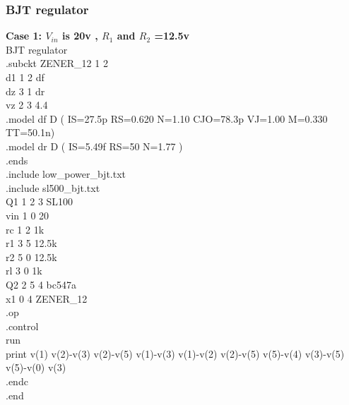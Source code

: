 \documentclass[12pt]{article}
\begin{document}
\subsubsection{BJT regulator}
\textbf{Case 1: \(V_{in}\) is 20v , \(R_{1}\) and \(R_{2}\) =12.5v\\}
BJT regulator\\
.subckt ZENER\_12 1 2\\
d1 1 2 df\\
dz 3 1 dr\\
vz 2 3 4.4\\
.model df D ( IS=27.5p RS=0.620 N=1.10 CJO=78.3p VJ=1.00 M=0.330 TT=50.1n)\\
.model dr D ( IS=5.49f RS=50 N=1.77 )\\
.ends\\
.include low\_power\_bjt.txt\\
.include sl500\_bjt.txt\\
Q1 1 2 3 SL100	\\
vin 1 0 20\\
rc 1 2 1k\\
r1 3 5 12.5k\\
r2 5 0 12.5k\\
rl 3 0 1k\\
Q2 2 5 4 bc547a\\
x1 0 4 ZENER\_12\\
.op \\
.control\\
run\\
print v(1) v(2)-v(3) v(2)-v(5) v(1)-v(3) v(1)-v(2) v(2)-v(5) v(5)-v(4) v(3)-v(5) v(5)-v(0) v(3)\\
.endc \\
.end\\
\newpage
\end{document}
